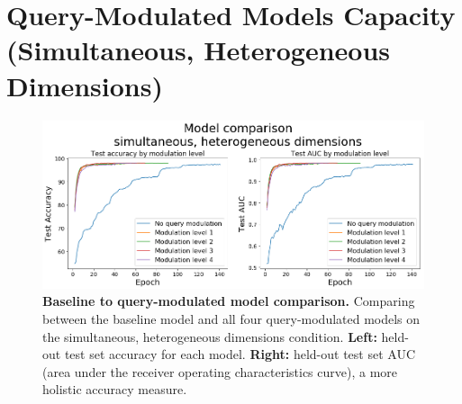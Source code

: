 \FloatBarrier
\section{Query-Modulated Models Capacity (Simultaneous, Heterogeneous Dimensions)\label{res:query-mod-baseline}}

\begin{figure}[!htb]
\centering
\includegraphics[width=\linewidth]{ch-results/figures/query_mod_simultaneous/baseline_comparison.png}
\caption[Baseline to query-modulated model comparison.]{ {\bf Baseline to query-modulated model comparison.} Comparing between the baseline model and all four query-modulated models on the simultaneous, heterogeneous dimensions condition. \textbf{Left:} held-out test set accuracy for each model. \textbf{Right:} held-out test set AUC (area under the receiver operating characteristics curve), a more holistic accuracy measure.}
\label{fig:results-query-mod-simultaneous-baseline-comparison}
\end{figure}

